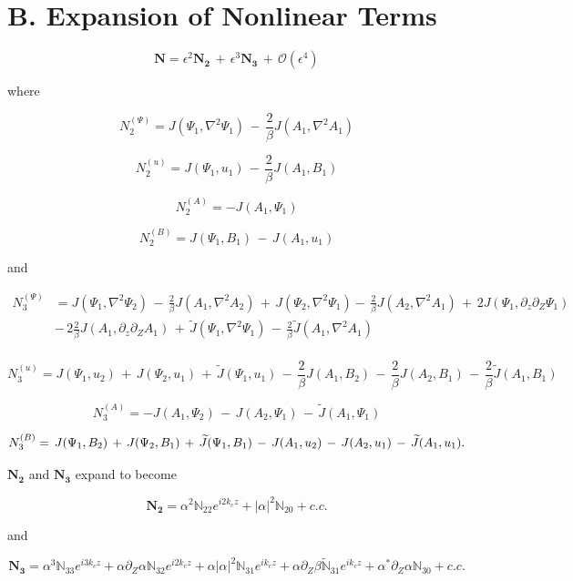 \documentclass{emulateapj}
\newcommand{\beq}{\begin{equation}}
\newcommand{\eeq}{\end{equation}}
\begin{document}
\section{B. Expansion of Nonlinear Terms}\label{app:nonlinear_terms}
\beq
\mathbf{N} = \epsilon^2\mathbf{N_2} \, + \, \epsilon^3\mathbf{N_3} \, + \, \mathcal{O}(\epsilon^4)
\eeq

where

\beq
N_2^{(\Psi)} = J(\Psi_1, \nabla^2 \Psi_1) \,-\, \frac{2}{\beta}J(A_1, \nabla^2 A_1) 
\eeq

\beq
N_2^{(u)} = J(\Psi_1, u_1) \, - \, \frac{2}{\beta} J(A_1, B_1) 
\eeq

\beq
N_2^{(A)} = - J(A_1, \Psi_1) 
\eeq

\beq
N_2^{(B)} =  J(\Psi_1, B_1) \, - \, J(A_1, u_1)
\eeq

and

\beq
\begin{split}
N_3^{(\Psi)} & = J(\Psi_1, \nabla^2\Psi_2) \, - \, \frac{2}{\beta}J(A_1, \nabla^2 A_2) \,+\, J(\Psi_2, \nabla^2\Psi_1) - \, \frac{2}{\beta}J(A_2, \nabla^2 A_1) \,+\, 2 J(\Psi_1, \partial_z\partial_Z \Psi_1) \, \\
& - \, 2 \frac{2}{\beta}J(A_1, \partial_z\partial_Z A_1) \,+\, \widetilde{J}(\Psi_1, \nabla^2 \Psi_1) \, - \,  \frac{2}{\beta}\widetilde{J}(A_1, \nabla^2 A_1)\\
\end{split}
\eeq

\beq
N_3^{(u)} = J(\Psi_1, u_2) \, + \, J(\Psi_2, u_1) \, + \, \widetilde{J}(\Psi_1, u_1) \, - \, \frac{2}{\beta} J(A_1, B_2) \, - \, \frac{2}{\beta} J(A_2, B_1) \, - \, \frac{2}{\beta} \widetilde{J}(A_1, B_1)
\eeq

\beq
N_3^{(A)} = - J(A_1, \Psi_2) \, - \, J(A_2, \Psi_1) \, - \, \widetilde{J}(A_1, \Psi_1)
\eeq

\beq
N_3^{(B)} = \, J(\Psi_1, B_2) \, + \, J(\Psi_2, B_1) \, + \, \widetilde{J}(\Psi_1, B_1) \, - \, J(A_1, u_2) \, - \,  J(A_2, u_1) \, - \, \widetilde{J}(A_1, u_1).\\
\eeq

$\mathbf{N_2}$ and $\mathbf{N_3}$ expand to become

\beq
\mathbf{N_2} = \alpha^2\mathbb{N}_{22} e^{i2 k_c z} + \left|\alpha\right|^2 \mathbb{N}_{20} + c.c.
\eeq

and

\beq
\mathbf{N_3} = \alpha^3 \mathbb{N}_{33} e^{i 3 k_c z} + \alpha\partial_Z\alpha \mathbb{N}_{32} e^{i 2 k_c z} + \alpha\left|\alpha\right|^2 \mathbb{N}_{31} e^{i k_c z} + \alpha \partial_Z  \beta \mathbb{\widetilde{N}}_{31} e^{i k_c z} + \alpha^*\partial_Z \alpha \mathbb{N}_{30} + c.c.
\eeq
\end{document}

